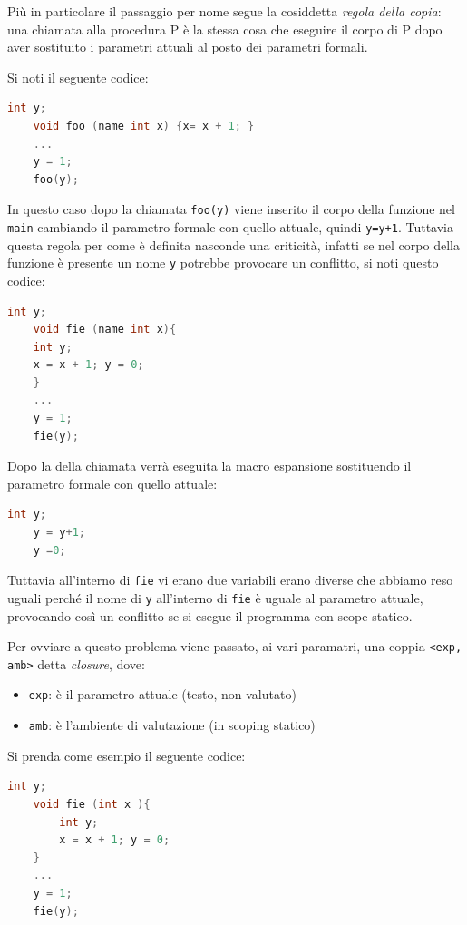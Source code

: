 Più in particolare il passaggio per nome segue la cosiddetta \textit{regola della copia}: una chiamata alla procedura P è la stessa cosa che eseguire il corpo di P dopo aver sostituito i parametri attuali al posto dei parametri formali.

Si noti il seguente codice:

\begin{lstlisting}[language=C]
    int y;
    void foo (name int x) {x= x + 1; }
    ...
    y = 1;
    foo(y);    
\end{lstlisting}

In questo caso dopo la chiamata \texttt{foo(y)} viene inserito il corpo della funzione nel \texttt{main}  cambiando il parametro formale con quello attuale, quindi \texttt{y=y+1}. Tuttavia questa regola per come è definita nasconde una criticità, infatti se nel corpo della funzione è presente un nome \texttt{y} potrebbe provocare un conflitto, si noti questo codice:

\begin{lstlisting}[language=C]
    int y;
    void fie (name int x){
    int y;
    x = x + 1; y = 0;
    }
    ...
    y = 1;
    fie(y);
\end{lstlisting}

Dopo la della chiamata verrà eseguita la macro espansione sostituendo il parametro formale con quello attuale:
\begin{lstlisting}[language=C]
    int y;
    y = y+1;
    y =0;
\end{lstlisting}

Tuttavia all'interno di \texttt{fie} vi erano due variabili erano diverse che abbiamo reso uguali perché il nome di \texttt{y} all'interno di \texttt{fie} è uguale al parametro attuale, provocando così un conflitto se si esegue il programma con scope statico. 

Per ovviare a questo problema viene passato, ai vari paramatri, una coppia \texttt{<exp, amb>} detta \textit{closure}, dove:
\begin{itemize}
    \item \texttt{exp}: è il parametro attuale (testo, non valutato)
    \item \texttt{amb}: è l’ambiente di valutazione (in scoping statico)
\end{itemize}

Si prenda come esempio il seguente codice:
\begin{lstlisting}[language=C]
    int y;
    void fie (int x ){
        int y;
        x = x + 1; y = 0;
    }
    ...
    y = 1;
    fie(y);
\end{lstlisting}

